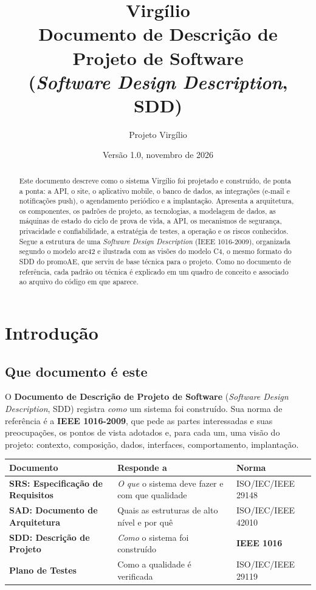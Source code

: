 \documentclass[11pt,a4paper]{report}
\title{\textbf{Virgílio}\\[6pt]\Large Documento de Descrição de Projeto de Software\\
  \large (\emph{Software Design Description}, SDD)}
\author{Projeto Virgílio}
\date{Versão 1.0, novembro de 2026}
\begin{document}
\maketitle

\begin{abstract}
Este documento descreve como o sistema Virgílio foi projetado e construído, de ponta a ponta: a API,
o site, o aplicativo mobile, o banco de dados, as integrações (e-mail e notificações push), o
agendamento periódico e a implantação. Apresenta a arquitetura, os componentes, os padrões de projeto,
as tecnologias, a modelagem de dados, as máquinas de estado do ciclo de prova de vida, a API, os
mecanismos de segurança, privacidade e confiabilidade, a estratégia de testes, a operação e os riscos
conhecidos. Segue a estrutura de uma \emph{Software Design Description} (IEEE 1016-2009), organizada
segundo o modelo arc42 e ilustrada com as visões do modelo C4, o mesmo formato do SDD do promoAE, que
serviu de base técnica para o projeto. Como no documento de referência, cada padrão ou técnica é
explicado em um quadro de conceito e associado ao arquivo do código em que aparece.
\end{abstract}

\tableofcontents

\chapter{Introdução}

\section{Que documento é este}

O \textbf{Documento de Descrição de Projeto de Software} (\emph{Software Design Description}, SDD)
registra \emph{como} um sistema foi construído. Sua norma de referência é a \textbf{IEEE 1016-2009},
que pede as partes interessadas e suas preocupações, os pontos de vista adotados e, para cada um, uma
visão do projeto: contexto, composição, dados, interfaces, comportamento, implantação.

\begin{center}
\begin{tabularx}{\textwidth}{@{}>{\bfseries}l Y l@{}}
\toprule
Documento & Responde a & Norma \\
\midrule
SRS: Especificação de Requisitos & \emph{O que} o sistema deve fazer e com que qualidade & ISO/IEC/IEEE 29148 \\
SAD: Documento de Arquitetura & Quais as estruturas de alto nível e por quê & ISO/IEC/IEEE 42010 \\
\textbf{SDD: Descrição de Projeto} & \emph{Como} o sistema foi construído & \textbf{IEEE 1016} \\
Plano de Testes & Como a qualidade é verificada & ISO/IEC/IEEE 29119 \\
\bottomrule
\end{tabularx}
\end{center}
\end{document}
